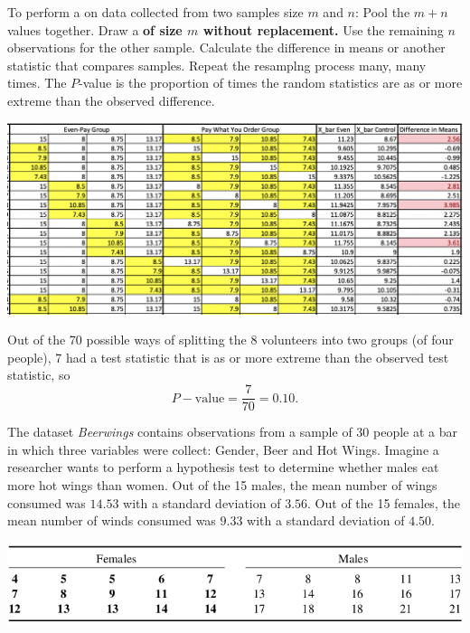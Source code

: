 \bbox
To perform a \textbf{} on data collected from two samples size $m$ and $n$:
\bi
\ii Pool the $m+n$ values together.
\ii Draw a \textbf{  of size $m$ without replacement.}
\ii Use the remaining $n$ observations for the other sample.
\ii Calculate the difference in means or another statistic that compares samples.
\ii Repeat the resamplng process many, many times.
\ii The $P$-value is the proportion of times the random statistics are as or more extreme than the observed difference.
\ei
\ebox

\clearpage

\begin{center}
\includegraphics[width=0.95\tw]{19/fig-meal-permutation.png}
\end{center}

Out of the 70 possible ways of splitting the 8 volunteers into two groups (of four people), 7 had a test statistic that is as or more extreme than the observed test statistic, so
\[ P-\mbox{value} = \frac{7}{70} = 0.10.\]


\bb[resume]
\ii The dataset \textit{Beerwings} contains observations from a sample of 30 people at a bar in which three variables were collect: Gender, Beer and Hot Wings. Imagine a researcher wants to perform a hypothesis test to determine whether males eat more hot wings than women. Out of the 15 males, the mean number of wings consumed was $14.53$ with a standard deviation of $3.56$. Out of the 15 females, the mean number of winds consumed was $9.33$ with a standard deviation of $4.50$.

\begin{center}
\includegraphics[width=0.75\tw]{19/fig-wings-table.png}
\end{center}

